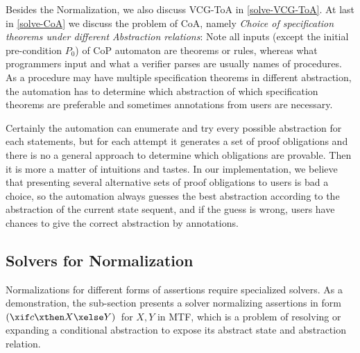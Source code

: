 Besides the Normalization, we also discuss VCG-ToA in \cref{solve-VCG-ToA}.
At last in \cref{solve-CoA} we discuss the problem of CoA, namely \emph{Choice of specification theorems under different Abstraction relations}:
Note all inputs (except the initial pre-condition $P_0$) of CoP automaton are theorems or rules, whereas what programmers input and what a verifier parses are usually names of procedures.
As a procedure may have multiple specification theorems in different abstraction, the automation has to determine which abstraction of which specification theorems are preferable and sometimes annotations from users are necessary.

Certainly the automation can enumerate and try every possible abstraction for each statements, but for each attempt it generates a set of proof obligations and there is no a general approach to determine which obligations are provable.
Then it is more a matter of intuitions and tastes.
In our implementation, we believe that presenting several alternative sets of proof obligations to users is bad a choice, so the automation always guesses the best abstraction according to the abstraction of the current state sequent, and if the guess is wrong, users have chances to give the correct abstraction by annotations.


\subsection{Solvers for Normalization}\label{solve-Normalization}

Normalizations for different forms of assertions require specialized solvers.
As a demonstration, the sub-section presents a solver normalizing assertions in form \small$(\xif c \xthen X \xelse Y)$\normalsize\, for $X,Y$ in MTF, which is a problem of resolving or expanding a conditional abstraction to expose its abstract state and abstraction relation.

